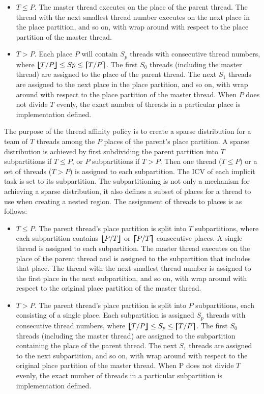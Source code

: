 \begin{itemize}
\item $T\leq P$.
The master thread executes on the place of the parent thread. The thread with the next smallest thread number executes on the next place in the place partition, and so on, with wrap around with respect to the place partition of the master thread.
\item $T>P$.
Each place $P$ will contain $S_{p}$ threads with consecutive thread numbers, 
where $\blfloor T/P \brfloor \leq Sp \leq \blceil T/P \brceil$. The first $S_{0}$ threads (including the master thread) are assigned to the place of the parent thread. The next $S_{1}$ threads are assigned to the next place in the place partition, and so on, with wrap around with respect to the place partition of the master thread. When $P$ does not divide $T$ evenly, the exact number of threads in a particular place is implementation defined.
\end{itemize}


The purpose of the  thread affinity policy is to create a sparse distribution for a 
team of $T$ threads among the $P$ places of the parent's place partition. A sparse distribution is achieved 
by first subdividing the parent partition into $T$ subpartitions if 
$T\leq P$, or $P$ subpartitions if $T>P$. Then one thread ($T\leq P$) or a 
set of threads ($T>P$) is assigned to each subpartition. The 
 ICV of each implicit task is set to its subpartition.
The subpartitioning is not only a mechanism for achieving a sparse 
distribution, it also defines a subset of places for a thread to use when 
creating a nested  region. The assignment of threads to places is as 
follows:

\begin{itemize}
\item $T\leq P$. The parent thread's place partition is split into $T$ subpartitions, where each subpartition 
contains $\bm{\lfloor\mkern-10mu\lfloor} P/T \bm{\rfloor\mkern-10mu\rfloor}$ or $\bm{\lceil\mkern-10mu\lceil} P/T \bm{\rceil\mkern-10mu\rceil}$ consecutive places. A single thread is assigned to each subpartition. The master thread executes on the place of the parent thread and is assigned to the subpartition that includes that place. The thread with the next smallest thread number is assigned to the first place in the next subpartition, and so on, with wrap around with respect to the original place partition of the master thread.

\item $T>P$. The parent thread's place partition is split into $P$ subpartitions, each consisting of a single place. Each subpartition is assigned $S_{p}$ threads with consecutive thread numbers, where $\blfloor T/P \brfloor \leq S_{p} \leq \blceil T/P \brceil$. The first $S_{0}$ threads (including the master thread) are assigned to the subpartition containing the place of the parent thread. The next $S_{1}$ threads are assigned to the next subpartition, and so on, with wrap around with respect to the original place partition of the master thread. When P does not divide $T$ evenly, the exact number of threads in a particular subpartition is implementation defined. 
\end{itemize}

